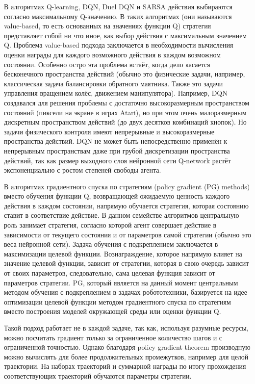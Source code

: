 В алгоритмах Q-learning, DQN, Duel DQN и SARSA действия выбираются согласно максимальному Q-значению. В таких алгоритмах (они называются value-based, то есть основанных на значениях функции Q) стратегия представляет собой ни что иное, как выбор действия с максимальным значением Q. Проблема value-based подхода заключается в необходимости вычисления оценки награды для каждого возможного действия в каждом возможном состоянии. Особенно остро эта проблема встаёт, когда дело касается бесконечного пространства действий (обычно это физические задачи, например, классическая задача балансировки обратного маятника. Также это задачи управления вращением колёс, движением манипулятора). Например, DQN создавался для решения проблемы с достаточно высокоразмерным пространством состояний (пиксели на экране в играх Atari), но при этом очень малоразмерным дискретным пространством действий (до двух десятков комбинаций кнопок). Но задачи физического контроля имеют непрерывные и высокоразмерные пространства действий. DQN не может быть непосредственно применён к непрерывным пространствам даже при грубой дискретизации пространства действий, так как размер выходного слоя нейронной сети Q-network растёт экспоненциально с ростом степеней свободы агента.

В алгоритмах градиентного спуска по стратегиям (policy gradient (PG) methods) вместо обучения функции Q, возвращающей ожидаемую ценность каждого действия в каждом состоянии, напрямую обучается стратегия, которая состоянию ставит в соответствие действие. В данном семействе алгоритмов центральную роль занимает стратегия, согласно которой агент совершает действие в зависимости от текущего состояния и от параметров самой стратегии (обычно это веса нейронной сети). Задача обучения с подкреплением заключается в максимизации целевой функции. Вознаграждение, которое напрямую влияет на значение целевой функции, зависит от стратегии, которая в свою очередь зависит от своих параметров, следовательно, сама целевая функция зависит от параметров стратегии. PG, который является на данный момент центральным методом обучения с подкреплением в задачах робототехники, базируется на идее оптимизации целевой функции методом градиентного спуска по стратегиям вместо построения моделей окружающей среды или оценки функции Q.

Такой подход работает не в каждой задаче, так как, используя разумные ресурсы, можно посчитать градиент только за ограниченное количество шагов и с ограниченной точностью. Однако благодаря policy gradient theorem производную можно вычислять для более продолжительных промежутков, например для целой траектории. На наборах траекторий и суммарной награды по итогу прохождения соответствующих траекторий обучаются параметры стратегии.

